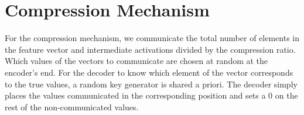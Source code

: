 \appendix
\section{Compression Mechanism}
\label{appendix:CompressionMechanism}


For the compression mechanism, we communicate the total number of elements in the feature vector and intermediate activations divided by the compression ratio. Which values of the vectors to communicate are chosen at random at the encoder's end. 
For the decoder to know which element of the vector corresponds to the true values, a random key generator is shared a priori. The decoder simply places the values communicated in the corresponding position and sets a $0$ on the rest of the non-communicated values.








